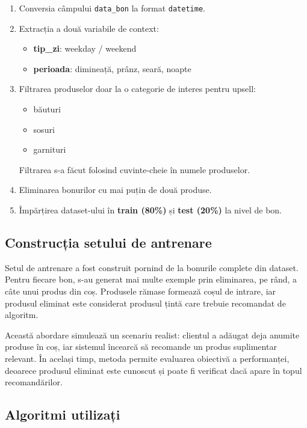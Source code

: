 \documentclass[12pt,a4paper]{article}
\begin{document}
\begin{enumerate}
    \item Conversia câmpului \texttt{data\_bon} la format \texttt{datetime}.
    \item Extracția a două variabile de context:
    \begin{itemize}
        \item \textbf{tip\_zi}: weekday / weekend
        \item \textbf{perioada}: dimineață, prânz, seară, noapte
    \end{itemize}
    \item Filtrarea produselor doar la o categorie de interes pentru upsell:
    \begin{itemize}
        \item băuturi
        \item sosuri
        \item garnituri
    \end{itemize}
    Filtrarea s-a făcut folosind cuvinte-cheie în numele produselor.
    \item Eliminarea bonurilor cu mai puțin de două produse.
    \item Împărțirea dataset-ului în \textbf{train (80\%)} și \textbf{test (20\%)} la nivel de bon.
\end{enumerate}

\subsection{Construcția setului de antrenare}

Setul de antrenare a fost construit pornind de la bonurile complete din dataset. Pentru fiecare bon, s-au generat mai multe exemple prin eliminarea, pe rând, a câte unui produs din coș. Produsele rămase formează coșul de intrare, iar produsul eliminat este considerat produsul țintă care trebuie recomandat de algoritm.

Această abordare simulează un scenariu realist: clientul a adăugat deja anumite produse în coș, iar sistemul încearcă să recomande un produs suplimentar relevant. În același timp, metoda permite evaluarea obiectivă a performanței, deoarece produsul eliminat este cunoscut și poate fi verificat dacă apare în topul recomandărilor.

\subsection{Algoritmi utilizați}
\end{document}
